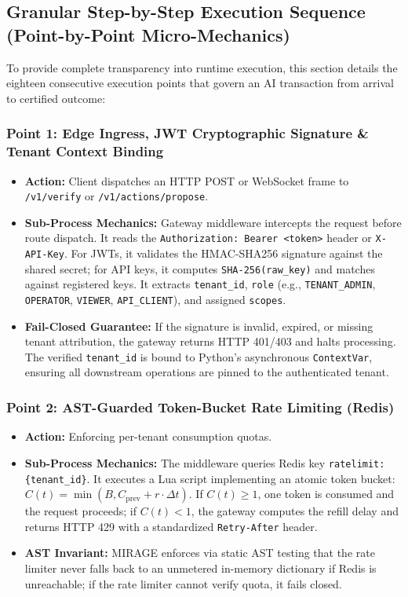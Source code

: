 \documentclass[11pt,a4paper]{article}
\begin{document}
\subsection{Granular Step-by-Step Execution Sequence (Point-by-Point Micro-Mechanics)}
To provide complete transparency into runtime execution, this section details the eighteen consecutive execution points that govern an AI transaction from arrival to certified outcome:

\subsubsection*{Point 1: Edge Ingress, JWT Cryptographic Signature \& Tenant Context Binding}
\begin{itemize}[leftmargin=*,itemsep=1pt]
  \item \textbf{Action:} Client dispatches an HTTP POST or WebSocket frame to \texttt{/v1/verify} or \texttt{/v1/actions/propose}.
  \item \textbf{Sub-Process Mechanics:} Gateway middleware intercepts the request before route dispatch. It reads the \texttt{Authorization: Bearer <token>} header or \texttt{X-API-Key}. For JWTs, it validates the HMAC-SHA256 signature against the shared secret; for API keys, it computes \texttt{SHA-256(raw\_key)} and matches against registered keys. It extracts \texttt{tenant\_id}, \texttt{role} (e.g., \texttt{TENANT\_ADMIN}, \texttt{OPERATOR}, \texttt{VIEWER}, \texttt{API\_CLIENT}), and assigned \texttt{scopes}.
  \item \textbf{Fail-Closed Guarantee:} If the signature is invalid, expired, or missing tenant attribution, the gateway returns HTTP 401/403 and halts processing. The verified \texttt{tenant\_id} is bound to Python's asynchronous \texttt{ContextVar}, ensuring all downstream operations are pinned to the authenticated tenant.
\end{itemize}

\subsubsection*{Point 2: AST-Guarded Token-Bucket Rate Limiting (Redis)}
\begin{itemize}[leftmargin=*,itemsep=1pt]
  \item \textbf{Action:} Enforcing per-tenant consumption quotas.
  \item \textbf{Sub-Process Mechanics:} The middleware queries Redis key \texttt{ratelimit:\{tenant\_id\}}. It executes a Lua script implementing an atomic token bucket: $C(t) = \min(B, C_{\text{prev}} + r \cdot \Delta t)$. If $C(t) \ge 1$, one token is consumed and the request proceeds; if $C(t) < 1$, the gateway computes the refill delay and returns HTTP 429 with a standardized \texttt{Retry-After} header.
  \item \textbf{AST Invariant:} MIRAGE enforces via static AST testing that the rate limiter never falls back to an unmetered in-memory dictionary if Redis is unreachable; if the rate limiter cannot verify quota, it fails closed.
\end{itemize}
\end{document}
